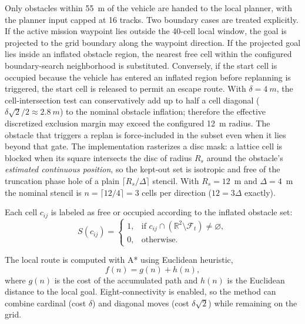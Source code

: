 \documentclass[electronics,article,submit,moreauthors]{Definitions/mdpi}
\DeclareRobustCommand{\added}[1]{#1}%
\DeclareRobustCommand{\added}[1]{\textcolor{green!50!black}{#1}}
\def\added#1{#1}%
\begin{document}
\added{Only obstacles within 55~m of the vehicle are handed to the local planner, with the planner input capped at 16 tracks. Two boundary cases are treated explicitly. If the active mission waypoint lies outside the 40-cell local window, the goal is projected to the grid boundary along the waypoint direction. If the projected goal lies inside an inflated obstacle region, the nearest free cell within the configured boundary-search neighborhood is substituted. Conversely, if the start cell is occupied because the vehicle has entered an inflated region before replanning is triggered, the start cell is released to permit an escape route. With $\delta=4~m$, the cell-intersection test can conservatively add up to half a cell diagonal ($\delta\sqrt{2}/2\approx2.8~m$) to the nominal obstacle inflation; therefore the effective discretized exclusion margin may exceed the configured 12~m radius.}
\added{The obstacle that triggers a replan is force-included in the subset even when it lies beyond that gate. The implementation rasterizes a disc mask: a lattice cell is blocked when its square intersects the disc of radius $R_s$ around the obstacle's \emph{estimated continuous position}, so the kept-out set is isotropic and free of the truncation phase hole of a plain $\lceil R_s/\Delta\rceil$ stencil. With $R_s = 12$~m and $\Delta = 4$~m the nominal stencil is $n = \lceil 12/4 \rceil = 3$ cells per direction ($12 = 3\Delta$ exactly).}




Each cell \(c_{ij}\) is labeled as free or occupied according to the inflated obstacle set:
\begin{equation}
    S(c_{ij}) =
    \begin{cases}
        1, & \text{if } c_{ij} \cap \left(\mathbb{R}^2 \setminus \mathcal{F}_t\right) \neq \varnothing,\\
        0, & \text{otherwise.}
    \end{cases}
\end{equation}

The local route is computed with A* \cite{hart1968formal} using Euclidean heuristic,
\begin{equation}
    f(n) = g(n) + h(n),
\end{equation}
where \(g(n)\) is the cost of the accumulated path and \(h(n)\) is the Euclidean distance to the local goal. Eight-connectivity is enabled, so the method can combine cardinal (cost $\delta$) and diagonal moves (cost $\delta\sqrt{2}$) while remaining on the grid.
\end{document}
